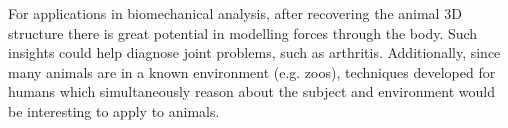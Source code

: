 For applications in biomechanical analysis, after recovering the animal 3D structure there is great potential in modelling forces through the body. Such insights could help diagnose joint problems, such as arthritis. Additionally, since many animals are in a known environment (e.g. zoos), techniques developed for humans which simultaneously reason about the subject and environment would be interesting to apply to animals. 







